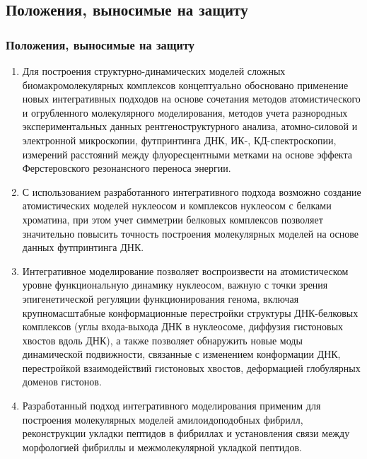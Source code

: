 \normalsize

\subsection{Положения, выносимые на защиту}
\begin{frame}
    \frametitle{Положения, выносимые на защиту}
    \scriptsize
    \begin{enumerate}
        \justifying
\item   Для построения структурно-динамических моделей сложных биомакромолекулярных комплексов концептуально обосновано применение новых интегративных подходов на основе сочетания методов атомистического и огрубленного молекулярного моделирования, методов учета разнородных экспериментальных данных рентгеноструктурного анализа, атомно-силовой и электронной микроскопии, футпринтинга ДНК, ИК-, КД-спектроскопии, измерений расстояний между флуоресцентными метками на основе эффекта Ферстеровского резонансного переноса энергии.
\item   С использованием разработанного интегративного подхода возможно создание атомистических моделей нуклеосом и комплексов нуклеосом с белками хроматина, при этом учет симметрии белковых комплексов позволяет значительно повысить точность построения молекулярных моделей на основе данных футпринтинга ДНК.
\item   Интегративное моделирование позволяет воспроизвести на атомистическом уровне функциональную динамику нуклеосом, важную с точки зрения эпигенетической регуляции функционирования генома, включая крупномасштабные конформационные перестройки структуры ДНК-белковых комплексов (углы входа-выхода ДНК в нуклеосоме, диффузия гистоновых хвостов вдоль ДНК), а также позволяет обнаружить новые моды динамической подвижности, связанные с изменением конформации ДНК, перестройкой взаимодействий гистоновых хвостов, деформацией глобулярных доменов гистонов.
\item   Разработанный подход интегративного моделирования применим для построения молекулярных моделей амилоидоподобных фибрилл, реконструкции укладки пептидов в фибриллах и установления связи между морфологией фибриллы и межмолекулярной укладкой пептидов.
    \end{enumerate}
\end{frame}
\normalsize
{}
